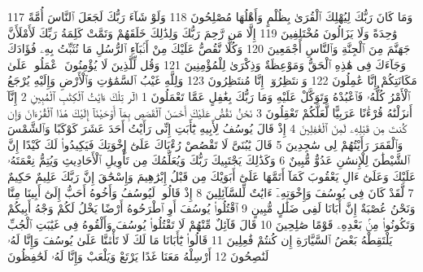 {\tiny\colorbox{cl_aya}{117}} وَمَا كَانَ رَبُّكَ لِيُهْلِكَ ٱلْقُرَىٰ بِظُلْمٍ وَأَهْلُهَا مُصْلِحُونَ
{\tiny\colorbox{cl_aya}{118}} وَلَوْ شَآءَ رَبُّكَ لَجَعَلَ ٱلنَّاسَ أُمَّةً وَٰحِدَةً وَلَا يَزَالُونَ مُخْتَلِفِينَ
{\tiny\colorbox{cl_aya}{119}} إِلَّا مَن رَّحِمَ رَبُّكَ وَلِذَٰلِكَ خَلَقَهُمْ وَتَمَّتْ كَلِمَةُ رَبِّكَ لَأَمْلَأَنَّ جَهَنَّمَ مِنَ ٱلْجِنَّةِ وَٱلنَّاسِ أَجْمَعِينَ
{\tiny\colorbox{cl_aya}{120}} وَكُلًّا نَّقُصُّ عَلَيْكَ مِنْ أَنۢبَآءِ ٱلرُّسُلِ مَا نُثَبِّتُ بِهِۦ فُؤَادَكَ وَجَآءَكَ فِى هَٰذِهِ ٱلْحَقُّ وَمَوْعِظَةٌ وَذِكْرَىٰ لِلْمُؤْمِنِينَ
{\tiny\colorbox{cl_aya}{121}} وَقُل لِّلَّذِينَ لَا يُؤْمِنُونَ ٱعْمَلُوا۟ عَلَىٰ مَكَانَتِكُمْ إِنَّا عَٰمِلُونَ
{\tiny\colorbox{cl_aya}{122}} وَٱنتَظِرُوٓا۟ إِنَّا مُنتَظِرُونَ
{\tiny\colorbox{cl_aya}{123}} وَلِلَّهِ غَيْبُ ٱلسَّمَٰوَٰتِ وَٱلْأَرْضِ وَإِلَيْهِ يُرْجَعُ ٱلْأَمْرُ كُلُّهُۥ فَٱعْبُدْهُ وَتَوَكَّلْ عَلَيْهِ وَمَا رَبُّكَ بِغَٰفِلٍ عَمَّا تَعْمَلُونَ
{\tiny\colorbox{cl_aya}{1}} الٓر تِلْكَ ءَايَٰتُ ٱلْكِتَٰبِ ٱلْمُبِينِ
{\tiny\colorbox{cl_aya}{2}} إِنَّآ أَنزَلْنَٰهُ قُرْءَٰنًا عَرَبِيًّا لَّعَلَّكُمْ تَعْقِلُونَ
{\tiny\colorbox{cl_aya}{3}} نَحْنُ نَقُصُّ عَلَيْكَ أَحْسَنَ ٱلْقَصَصِ بِمَآ أَوْحَيْنَآ إِلَيْكَ هَٰذَا ٱلْقُرْءَانَ وَإِن كُنتَ مِن قَبْلِهِۦ لَمِنَ ٱلْغَٰفِلِينَ
{\tiny\colorbox{cl_aya}{4}} إِذْ قَالَ يُوسُفُ لِأَبِيهِ يَٰٓأَبَتِ إِنِّى رَأَيْتُ أَحَدَ عَشَرَ كَوْكَبًا وَٱلشَّمْسَ وَٱلْقَمَرَ رَأَيْتُهُمْ لِى سَٰجِدِينَ
{\tiny\colorbox{cl_aya}{5}} قَالَ يَٰبُنَىَّ لَا تَقْصُصْ رُءْيَاكَ عَلَىٰٓ إِخْوَتِكَ فَيَكِيدُوا۟ لَكَ كَيْدًا إِنَّ ٱلشَّيْطَٰنَ لِلْإِنسَٰنِ عَدُوٌّ مُّبِينٌ
{\tiny\colorbox{cl_aya}{6}} وَكَذَٰلِكَ يَجْتَبِيكَ رَبُّكَ وَيُعَلِّمُكَ مِن تَأْوِيلِ ٱلْأَحَادِيثِ وَيُتِمُّ نِعْمَتَهُۥ عَلَيْكَ وَعَلَىٰٓ ءَالِ يَعْقُوبَ كَمَآ أَتَمَّهَا عَلَىٰٓ أَبَوَيْكَ مِن قَبْلُ إِبْرَٰهِيمَ وَإِسْحَٰقَ إِنَّ رَبَّكَ عَلِيمٌ حَكِيمٌ
{\tiny\colorbox{cl_aya}{7}} لَّقَدْ كَانَ فِى يُوسُفَ وَإِخْوَتِهِۦٓ ءَايَٰتٌ لِّلسَّآئِلِينَ
{\tiny\colorbox{cl_aya}{8}} إِذْ قَالُوا۟ لَيُوسُفُ وَأَخُوهُ أَحَبُّ إِلَىٰٓ أَبِينَا مِنَّا وَنَحْنُ عُصْبَةٌ إِنَّ أَبَانَا لَفِى ضَلَٰلٍ مُّبِينٍ
{\tiny\colorbox{cl_aya}{9}} ٱقْتُلُوا۟ يُوسُفَ أَوِ ٱطْرَحُوهُ أَرْضًا يَخْلُ لَكُمْ وَجْهُ أَبِيكُمْ وَتَكُونُوا۟ مِنۢ بَعْدِهِۦ قَوْمًا صَٰلِحِينَ
{\tiny\colorbox{cl_aya}{10}} قَالَ قَآئِلٌ مِّنْهُمْ لَا تَقْتُلُوا۟ يُوسُفَ وَأَلْقُوهُ فِى غَيَٰبَتِ ٱلْجُبِّ يَلْتَقِطْهُ بَعْضُ ٱلسَّيَّارَةِ إِن كُنتُمْ فَٰعِلِينَ
{\tiny\colorbox{cl_aya}{11}} قَالُوا۟ يَٰٓأَبَانَا مَا لَكَ لَا تَأْمَ۫نَّا عَلَىٰ يُوسُفَ وَإِنَّا لَهُۥ لَنَٰصِحُونَ
{\tiny\colorbox{cl_aya}{12}} أَرْسِلْهُ مَعَنَا غَدًا يَرْتَعْ وَيَلْعَبْ وَإِنَّا لَهُۥ لَحَٰفِظُونَ
